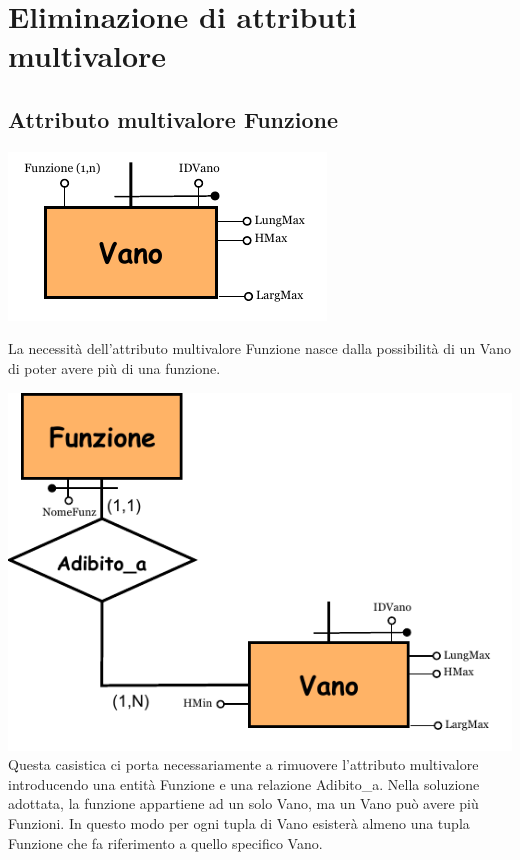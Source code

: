 \documentclass[12pt,a4paper]{report}
\begin{document}
                \chapter{Eliminazione di attributi multivalore}
                \section{Attributo multivalore Funzione}
                \begin{center}
                    \includegraphics[scale=1.3]{multiFun.pdf}
                \end{center}
                \vspace*{1cm}
                La necessità dell'attributo multivalore Funzione nasce dalla possibilità di un Vano di poter avere più di una funzione.
                
                \vspace*{1cm}
            \begin{multicols}{2}
                \includegraphics[scale=1.0]{multiFunTrad.pdf}
                Questa casistica ci porta necessariamente a rimuovere l'attributo multivalore introducendo una entità Funzione e una relazione Adibito\_a. Nella soluzione adottata, la funzione appartiene ad un solo Vano, ma un Vano può avere più Funzioni. In questo modo per ogni tupla di Vano esisterà almeno una tupla Funzione che fa riferimento a quello specifico Vano.
            \end{multicols}
\end{document}
